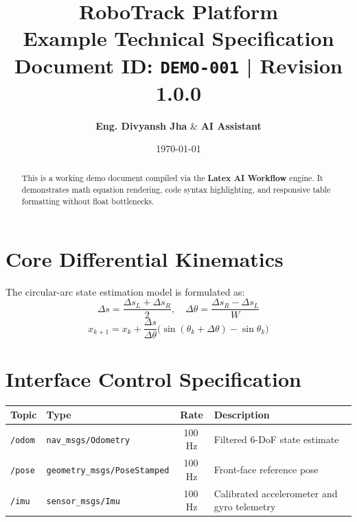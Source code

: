 \documentclass[11pt,a4paper]{article}
\title{
    \vspace{-1.2cm}
    \textbf{\huge \color{primaryblue} RoboTrack Platform} \\
    \vspace{0.2cm}
    \Large \textbf{Example Technical Specification} \\
    \vspace{0.15cm}
    \normalsize Document ID: \texttt{DEMO-001} \quad | \quad Revision 1.0.0
}
\author{\textbf{Eng. Divyansh Jha} \quad \& \quad \textbf{AI Assistant}}
\date{\today}
\begin{document}
\maketitle
\thispagestyle{fancy}

\begin{abstract}
\noindent This is a working demo document compiled via the \textbf{Latex AI Workflow} engine. It demonstrates math equation rendering, code syntax highlighting, and responsive table formatting without float bottlenecks.
\end{abstract}

\section{Core Differential Kinematics}
The circular-arc state estimation model is formulated as:
\begin{equation}
\Delta s = \frac{\Delta s_L + \Delta s_R}{2}, \quad \Delta \theta = \frac{\Delta s_R - \Delta s_L}{W}
\end{equation}
\begin{equation}
x_{k+1} = x_k + \frac{\Delta s}{\Delta \theta} \big(\sin(\theta_k + \Delta \theta) - \sin\theta_k\big)
\end{equation}

\section{Interface Control Specification}
\begin{center}
\footnotesize
\renewcommand{\arraystretch}{1.15}
\begin{tabularx}{\textwidth}{@{} l l c Y @{}}
\toprule
\textbf{Topic} & \textbf{Type} & \textbf{Rate} & \textbf{Description} \\
\midrule
\texttt{/odom} & \texttt{nav\_msgs/Odometry} & 100\,Hz & Filtered 6-DoF state estimate \\
\texttt{/pose} & \texttt{geometry\_msgs/PoseStamped} & 100\,Hz & Front-face reference pose \\
\texttt{/imu}  & \texttt{sensor\_msgs/Imu} & 100\,Hz & Calibrated accelerometer and gyro telemetry \\
\bottomrule
\end{tabularx}
\vspace{-4pt}
\end{center}
\end{document}
